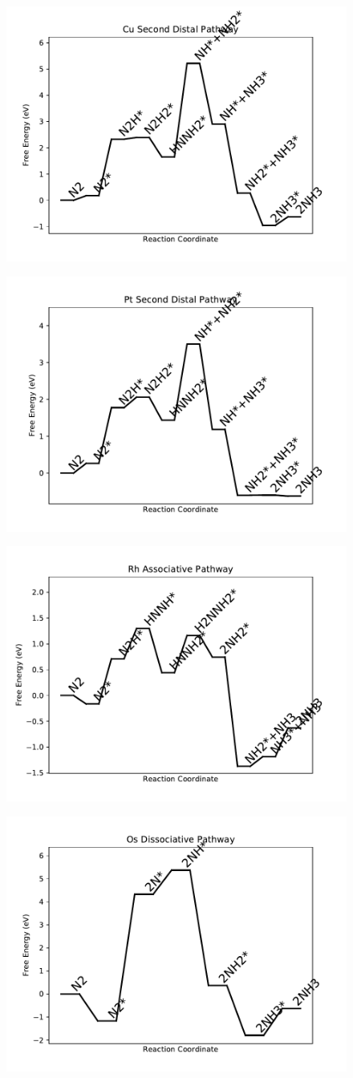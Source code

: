 \documentclass[journal=jacsat,manuscript=article]{achemso}
\begin{document}
\newpage
\begin{figure}
\includegraphics[width=0.5\linewidth]{data/plots/Cu_distal_2.pdf}
\label{fig:Cu_distal_2}
\end{figure}

\begin{figure}
\includegraphics[width=0.5\linewidth]{data/plots/Pt_distal_2.pdf}
\label{fig:Pt_distal_2}
\end{figure}

\newpage
\begin{figure}
\includegraphics[width=0.5\linewidth]{data/plots/Rh_associative.pdf}
\label{fig:Rh_associative}
\end{figure}

\begin{figure}
\includegraphics[width=0.5\linewidth]{data/plots/Os_dissociative.pdf}
\label{fig:Os_dissociative}
\end{figure}
\end{document}
